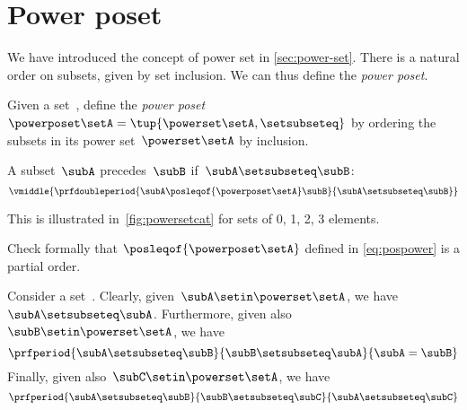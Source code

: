 
\section{Power poset}

We have introduced the concept of power set in \cref{sec:power-set}.
There is a natural order on subsets, given by set inclusion.
We can thus define the \emph{power poset}.

\begin{definition}
    \label{def:power-poset}
    Given a set~\setA,
    define the \emph{power poset}~$\powerposet\setA = \tup{\powerset\setA,\setsubseteq}$ by ordering the subsets in its power set~$\powerset\setA$ by inclusion.

    A subset~$\subA$ precedes~$\subB$ if~$\subA \setsubseteq \subB$:
    \begin{equation} \label{eq:pospower}
        \vmiddle{
            \prfdoubleperiod{
                \subA \posleqof{\powerposet\setA} \subB
            }{
                \subA \setsubseteq \subB
            }
        }
    \end{equation}
\end{definition}
This is illustrated in~\cref{fig:powersetcat} for sets of 0, 1, 2, 3 elements.
\begin{exercise}
    Check formally that $\posleqof{\powerposet\setA}$ defined in \cref{eq:pospower} is a partial order.
\end{exercise}
\begin{solution}
    Consider a set~\setA.
    Clearly, given~$\subA\setin \powerset \setA$, we have~$\subA\setsubseteq \subA$.
    Furthermore, given also~$\subB\setin \powerset \setA$, we have
    \begin{equation}\label{eq:ex-pospower-1}
        \prfperiod{
            \subA\setsubseteq \subB
        }{
            \subB\setsubseteq \subA
        }{
            \subA=\subB
        }
    \end{equation}
    Finally, given also~$\subC\setin \powerset \setA$, we have
    \begin{equation}\label{eq:ex-pospower-2}
        \prfperiod{
            \subA\setsubseteq \subB
        }{
            \subB\setsubseteq \subC
        }{
            \subA\setsubseteq\subC
        }
    \end{equation}
\end{solution}
\vfill
\begin{figure*}[h]
    \centering
    \hfill
    \hfill
    \hfill
    \caption{Power set as a poset.
    }
    \label{fig:powersetcat}
\end{figure*}
\vfill
